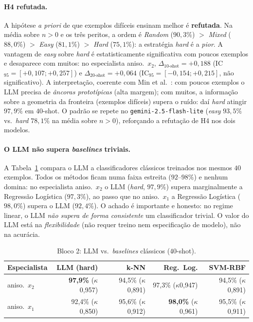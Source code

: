 \documentclass[12pt,a4paper]{article}
\begin{document}
\paragraph{H4 refutada.}
A hipótese \emph{a priori} de que exemplos difíceis ensinam melhor é \textbf{refutada}. Na
média sobre $n>0$ e os três peritos, a ordem é \emph{Random} ($90{,}3\%$) $>$ \emph{Mixed}
($88{,}0\%$) $>$ \emph{Easy} ($81{,}1\%$) $>$ \emph{Hard} ($75{,}1\%$): a estratégia
\emph{hard} é a \emph{pior}. A vantagem de \emph{easy} sobre \emph{hard} é estatisticamente
significativa com poucos exemplos e desaparece com muitos: no especialista aniso.\ $x_2$,
$\Delta_{10\text{-shot}} = +0{,}188$ (IC$_{95}=[+0{,}107;+0{,}257]$) e
$\Delta_{20\text{-shot}} = +0{,}064$ (IC$_{95}=[-0{,}154;+0{,}215]$, não significativo). A
interpretação, coerente com Min et al.~\cite{minRethinkingRole2022}: com poucos exemplos o
LLM precisa de \emph{âncoras prototípicas} (alta margem); com muitos, a informação sobre a
geometria da fronteira (exemplos difíceis) supera o ruído: daí \emph{hard} atingir $97{,}9\%$
em $40$-shot. O padrão se repete no \texttt{gemini-2.5-flash-lite} (\emph{easy} $93{,}5\%$
vs.\ \emph{hard} $78{,}1\%$ na média sobre $n>0$), reforçando a refutação de H4 nos dois
modelos.

\paragraph{O LLM não supera \emph{baselines} triviais.}
A Tabela~\ref{tab:baselines} compara o LLM a classificadores clássicos treinados nos mesmos
$40$ exemplos. Todos os métodos ficam numa faixa estreita ($92$–$98\%$) e nenhum domina: no
especialista aniso.\ $x_2$ o LLM (\emph{hard}, $97{,}9\%$) supera marginalmente a Regressão
Logística ($97{,}3\%$), ao passo que no aniso.\ $x_1$ a Regressão Logística ($98{,}0\%$)
supera o LLM ($92{,}4\%$). O achado é importante e honesto: no regime linear, o LLM
\emph{não supera de forma consistente} um classificador trivial. O valor do LLM está na
\emph{flexibilidade} (não requer treino nem especificação de modelo), não na acurácia.

\begin{table}[ht]
\centering
\caption{Bloco 2: LLM vs.\ \emph{baselines} clássicos ($40$-shot).}
\label{tab:baselines}
\begin{tabular}{lrrrr}
\toprule
\textbf{Especialista} & \textbf{LLM (hard)} & \textbf{k-NN} &
\textbf{Reg.\ Log.} & \textbf{SVM-RBF} \\
\midrule
aniso.\ $x_2$ & \textbf{97,9\%} ($\kappa$0,957) & 94,5\% ($\kappa$0,891) &
  97,3\% ($\kappa$0,947) & 94,5\% ($\kappa$0,891) \\
aniso.\ $x_1$ & 92,4\% ($\kappa$0,850)         & 95,6\% ($\kappa$0,912)    &
  \textbf{98,0\%} ($\kappa$0,961) & 95,5\% ($\kappa$0,911) \\
\bottomrule
\end{tabular}
\end{table}
\end{document}
